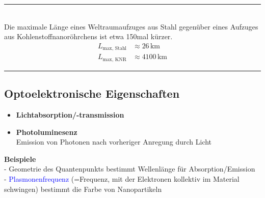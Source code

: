 \documentclass{article}
\begin{document}
\vspace{0.5cm}

{\color{blue}
\hrule
	\\
	Die maximale Länge eines Weltraumaufzuges aus Stahl gegenüber eines Aufzuges aus Kohlenstoffnanoröhrchens ist etwa 150mal kürzer.
		\begin{align*}
			L_\text{max, Stahl} &\approx 26\,\text{km} \\
			L_\text{max, KNR} &\approx 4100\,\text{km}
		\end{align*}


\hrule
}

\subsection{Optoelektronische Eigenschaften}
	\begin{itemize}
		\item \textbf{Lichtabsorption/-transmission}

		\item \textbf{Photoluminesenz}\\
		Emission von Photonen nach vorheriger Anregung durch Licht
	\end{itemize}

\textbf{Beispiele}\\
- Geometrie des Quantenpunkts bestimmt Wellenlänge für Absorption/Emission\\
- \textcolor{blue}{Plasmonenfrequenz} \textcolor{gruen}{(=Frequenz, mit der Elektronen kollektiv im Material schwingen)} bestimmt die Farbe von Nanopartikeln
\end{document}

